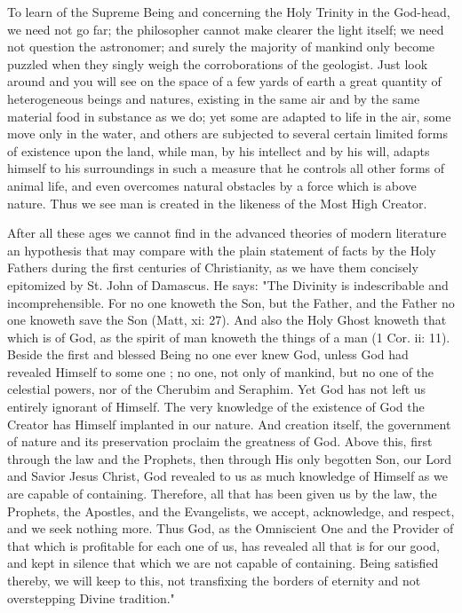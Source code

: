 To learn of the Supreme Being and concerning
the Holy Trinity in the God-head, we need 
not go far; the philosopher cannot make clearer 
the light itself; we need not question the astronomer;
and surely the majority of mankind only 
become puzzled when they singly weigh the corroborations
of the geologist. Just look around 
and you will see on the space of a few yards of 
earth a great quantity of heterogeneous beings 
and natures, existing in the same air and by the 
same material food in substance as we do; yet 
some are adapted to life in the air, some move 
only in the water, and others are subjected to 
several certain limited forms of existence upon 
the land, while man, by his intellect and by his 
will, adapts himself to his surroundings in such 
a measure that he controls all other forms of 
animal life, and even overcomes natural obstacles 
by a force which is above nature. Thus we see 
man is created in the likeness of the Most High 
Creator. 

After all these ages we cannot find in the advanced
theories of modern literature an hypothesis
that may compare with the plain statement 
of facts by the Holy Fathers during the first 
centuries of Christianity, as we have them concisely
epitomized by St. John of Damascus. He 
says: "The Divinity is indescribable and incomprehensible.
For no one knoweth the Son, 
but the Father, and the Father no one knoweth 
save the Son (Matt, xi: 27). And also the Holy 
Ghost knoweth that which is of God, as the 
spirit of man knoweth the things of a man 
(1 Cor. ii: 11). Beside the first and blessed 
Being no one ever knew God, unless God had 
revealed Himself to some one ; no one, not only 
of mankind, but no one of the celestial powers, 
nor of the Cherubim and Seraphim. Yet God 
has not left us entirely ignorant of Himself. 
The very knowledge of the existence of God 
the Creator has Himself implanted in our nature. 
And creation itself, the government of nature 
and its preservation proclaim the greatness of 
God. Above this, first through the law and the 
Prophets, then through His only begotten Son, 
our Lord and Savior Jesus Christ, God revealed 
to us as much knowledge of Himself as we are 
capable of containing. Therefore, all that has
been given us by the law, the Prophets, the 
Apostles, and the Evangelists, we accept, acknowledge,
and respect, and we seek nothing more. 
Thus God, as the Omniscient One and the Provider
of that which is profitable for each one of 
us, has revealed all that is for our good, and kept 
in silence that which we are not capable of containing.
Being satisfied thereby, we will keep 
to this, not transfixing the borders of eternity 
and not overstepping Divine tradition." 


